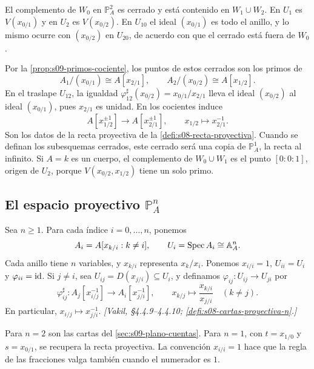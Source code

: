 \begin{obs}
\label{obs:s09-recta-infinito}
El complemento de $W_0$ en $\mathbb P^2_A$ es cerrado y está contenido en $W_1\cup W_2$. En $U_1$ es $V(x_{0/1})$ y en $U_2$ es $V(x_{0/2})$. En $U_{10}$ el ideal $(x_{0/1})$ es todo el anillo, y lo mismo ocurre con $(x_{0/2})$ en $U_{20}$, de acuerdo con que el cerrado está fuera de $W_0$.

Por la \cref{prop:s09-primos-cociente}, los puntos de estos cerrados son los primos de
\[
A_1/(x_{0/1})\cong A[x_{2/1}],
\qquad
A_2/(x_{0/2})\cong A[x_{1/2}].
\]
En el traslape $U_{12}$, la igualdad $\varphi_{12}^\sharp(x_{0/2})=x_{0/1}/x_{2/1}$ lleva el ideal $(x_{0/2})$ al ideal $(x_{0/1})$, pues $x_{2/1}$ es unidad. En los cocientes induce
\[
A[x_{1/2}^{\pm1}]\longrightarrow A[x_{2/1}^{\pm1}],
\qquad x_{1/2}\longmapsto x_{2/1}^{-1}.
\]
Son los datos de la recta proyectiva de la \cref{defi:s08-recta-proyectiva}. Cuando se definan los subesquemas cerrados, este cerrado será una copia de $\mathbb P^1_A$, la recta al infinito. Si $A=k$ es un cuerpo, el complemento de $W_0\cup W_1$ es el punto $[0:0:1]$, origen de $U_2$, porque $V(x_{0/2},x_{1/2})$ tiene un solo primo.
\end{obs}

\subsection{El espacio proyectivo \texorpdfstring{$\mathbb P^n_A$}{PnA}}

\begin{defi}
\label{defi:s09-cartas-proyectivas}
Sea $n\ge1$. Para cada índice $i=0,\ldots,n$, ponemos
\[
A_i=A[x_{k/i}:k\ne i],\qquad U_i=\operatorname{Spec} A_i\cong\mathbb A^n_A.
\]
Cada anillo tiene $n$ variables, y $x_{k/i}$ representa $x_k/x_i$. Ponemos $x_{i/i}=1$, $U_{ii}=U_i$ y $\varphi_{ii}=\operatorname{id}$. Si $j\ne i$, sea $U_{ij}=D(x_{j/i})\subseteq U_i$, y definamos $\varphi_{ij}\colon U_{ij}\to U_{ji}$ por
\[
\varphi_{ij}^\sharp\colon A_j[x_{i/j}^{-1}]\longrightarrow A_i[x_{j/i}^{-1}],
\qquad x_{k/j}\longmapsto\frac{x_{k/i}}{x_{j/i}}\quad(k\ne j).
\]
En particular, $x_{i/j}\mapsto x_{j/i}^{-1}$. \emph{[Vakil, \S4.4.9--4.4.10; \cref{defi:s08-cartas-proyectiva-n}.]}
\end{defi}

Para $n=2$ son las cartas del \cref{sec:s09-plano-cuentas}. Para $n=1$, con $t=x_{1/0}$ y $s=x_{0/1}$, se recupera la recta proyectiva. La convención $x_{i/i}=1$ hace que la regla de las fracciones valga también cuando el numerador es $1$.

